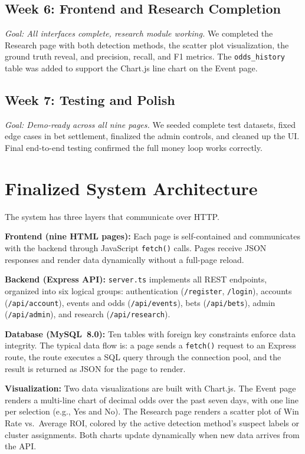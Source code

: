\documentclass[sigconf,nonacm]{acmart}
\begin{document}
\subsection{Week 6: Frontend and Research Completion}
\textit{Goal: All interfaces complete, research module working.} We
completed the Research page with both detection methods, the scatter
plot visualization, the ground truth reveal, and precision, recall, and
F1 metrics. The \texttt{odds\_history} table was added to support the
Chart.js line chart on the Event page.

\subsection{Week 7: Testing and Polish}
\textit{Goal: Demo-ready across all nine pages.} We seeded complete
test datasets, fixed edge cases in bet settlement, finalized the admin
controls, and cleaned up the UI. Final end-to-end testing confirmed
the full money loop works correctly.

\section{Finalized System Architecture}

The system has three layers that communicate over HTTP.

\textbf{Frontend (nine HTML pages):} Each page is self-contained and
communicates with the backend through JavaScript \texttt{fetch()} calls.
Pages receive JSON responses and render data dynamically without a
full-page reload.

\textbf{Backend (Express API):} \texttt{server.ts} implements all REST
endpoints, organized into six logical groups: authentication
(\texttt{/register}, \texttt{/login}), accounts
(\texttt{/api/account}), events and odds (\texttt{/api/events}), bets
(\texttt{/api/bets}), admin (\texttt{/api/admin}), and research
(\texttt{/api/research}).

\textbf{Database (MySQL~8.0):} Ten tables with foreign key constraints
enforce data integrity. The typical data flow is: a page sends a
\texttt{fetch()} request to an Express route, the route executes a SQL
query through the connection pool, and the result is returned as JSON
for the page to render.

\textbf{Visualization:} Two data visualizations are built with
Chart.js. The Event page renders a multi-line chart of decimal odds
over the past seven days, with one line per selection (e.g., Yes and
No). The Research page renders a scatter plot of Win Rate vs.\ Average
ROI, colored by the active detection method's suspect labels or cluster
assignments. Both charts update dynamically when new data arrives from
the API.
\end{document}
